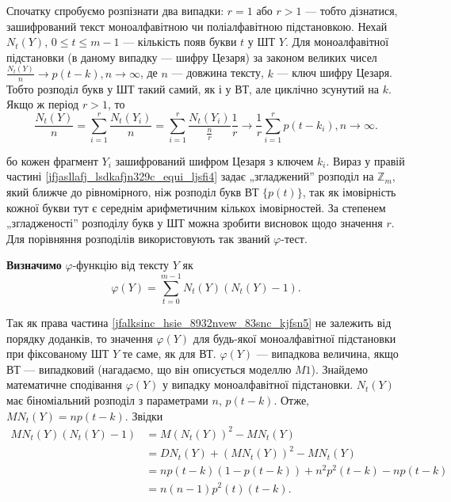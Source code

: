 Спочатку спробуємо розпізнати два випадки:
$r = 1$ або $r > 1$ --- тобто
дізнатися, зашифрований текст моноалфавітною чи поліалфавітною
підстановкою. Нехай $N_t(Y)$, $0 \leqslant t \leqslant m - 1$ ---
кількість появ букви $t$ у ШТ $Y$.
Для моноалфавітної підстановки (в даному випадку --- шифру Цезаря) за
законом великих чисел
$\frac{N_t(Y)}{n} \rightarrow p(t-k), n \rightarrow \infty$, де
$n$ --- довжина тексту, $k$ --- ключ шифру Цезаря. Тобто розподіл
букв у ШТ такий самий, як і у ВТ, але
циклічно зсунутий на $k$. Якщо ж період $r > 1$, то
\begin{equation}
    \label{jfjasllafj_lsdkafjn329c_equi_ljsfi4}
    \frac{N_t(Y)}{n}
    = \sum\limits_{i=1}^{r} \frac{N_t(Y_i)}{n}
    = \sum\limits_{i=1}^{r} \frac{N_t(Y_i)}{\frac{n}{r}} \frac{1}{r}
    \rightarrow \frac{1}{r} \sum\limits_{i=1}^{r} p(t - k_i), n \rightarrow \infty.
\end{equation}

бо кожен фрагмент $Y_i$ зашифрований шифром Цезаря з ключем $k_i$. Вираз у
правій частині \ref{jfjasllafj_lsdkafjn329c_equi_ljsfi4} задає „згладжений” розподіл на
$\mathbb{Z}_m$, який ближче до
рівномірного, ніж розподіл букв ВТ $\{p(t)\}$, так як імовірність кожної букви
тут є середнім арифметичним кількох імовірностей. За степенем
„згладженості” розподілу букв у ШТ можна зробити висновок щодо значення
$r$. Для порівняння розподілів використовують так званий $\varphi$-тест.

\textbf{Визначимо} $\varphi$-функцію від тексту $Y$ як
\begin{equation}
    \label{jfalksinc_hsie_8932nvew_83snc_kjfsn5}
    \varphi(Y) = \sum\limits_{t=0}^{m-1} N_t(Y) (N_t(Y) - 1).
\end{equation}

Так як права частина \ref{jfalksinc_hsie_8932nvew_83snc_kjfsn5}
не залежить від порядку доданків, то значення
$\varphi(Y)$ для будь-якої моноалфавітної підстановки при фіксованому ШТ
$Y$ те саме, як для ВТ. $\varphi(Y)$ --- випадкова величина, якщо ВТ --- випадковий
(нагадаємо, що він описується моделлю $M1$). Знайдемо математичне
сподівання $\varphi(Y)$ у випадку моноалфавітної підстановки.
$N_t(Y)$ має біноміальний розподіл з параметрами $n$, $p(t - k)$.
Отже, $MN_t(Y) = np(t-k)$.
Звідки
\begin{equation}
    \begin{split}
        MN_t(Y)(N_t(Y) - 1)
        & = M(N_t(Y))^2 - MN_t(Y)  \\
        & = DN_t(Y) + (MN_t(Y))^2 - MN_t(Y)  \\
        & = np(t-k)(1 - p(t-k)) + n^2p^2(t-k) - np(t-k)  \\
        & = n(n-1) p^2(t) (t-k). \\
    \end{split}
\end{equation}

